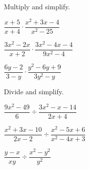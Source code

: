\begin{exercise} Multiply and simplify.\\
	\begin{enumerate*}[label={(\arabic*)~~}]
		\item $\dfrac{x+5}{x+4}\cdot\dfrac{x^2+3x-4}{x^2-25}$
		\item $\dfrac{3x^2-2x}{x+2}\cdot\dfrac{3x^2-4x-4}{9x^2-4}$
		\item $\dfrac{6y-2}{3-y}\cdot\dfrac{y^2-6y+9}{3y^2-y}$
		\hfill\null
	\end{enumerate*}
\end{exercise}


\vfill
\begin{center} \hfill
\end{center}



\newpage

\begin{exercise}
	Divide and simplify.\\
	\begin{enumerate*}[label={(\arabic*)~}]
		\item $\dfrac{9x^2-49}{6}\div\dfrac{3x^2-x-14}{2x+4}$
		\item $\dfrac{x^2+3x-10}{2x-2}\div\dfrac{x^2-5x+6}{x^2-4x+3}$
		\item $\dfrac{y-x}{xy}\div\dfrac{x^2-y^2}{y^2}$
		\hfill\null
	\end{enumerate*}
\end{exercise}

\vfill
\begin{center} \hfill
\end{center}

